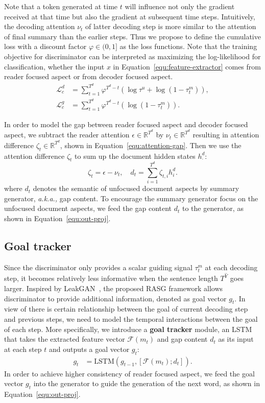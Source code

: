 \documentclass[letterpaper]{article}
\newcommand{\aka}{\emph{a.k.a.,}\xspace}
\begin{document}
Note that a token generated at time $t$ will influence not only the gradient received at that time but also the gradient at subsequent time steps.
Intuitively, the decoding attention $\nu_t$ of latter decoding step is more similar to the attention of final summary than the earlier steps.
Thus we propose to define the cumulative loss with a discount factor $\varphi \in (0,1]$ as the loss functions.
Note that the training objective for discriminator can be interpreted as maximizing the log-likelihood for classification, whether the input $x$ in Equation~\ref{equ:feature-extractor} comes from reader focused aspect or from decoder focused aspect.
\begin{align}
    \mathcal{L}^d_c &= \textstyle \sum^{T^d}_{t=1} \varphi^{T^d-t} (\log \tau^{u} + \log (1 - \tau^m_t)), \label{equ:dis-d}\\
    \mathcal{L}^g_c &= \textstyle \sum^{T^d}_{t=1} \varphi^{T^d-t} (\log (1 - \tau^m_t)). \label{equ:dis-c}
\end{align}

In order to model the gap between reader focused aspect and decoder focused aspect, we subtract the reader attention $\epsilon \in \mathbb{R}^{T^d}$ by $\nu_{t} \in \mathbb{R}^{T^d}$ resulting in attention difference $\zeta_t \in\mathbb{R}^{T^d}$, shown in Equation~\ref{equ:attention-gap}.
Then we use the attention difference $\zeta_t$ to sum up the document hidden states $h^d_{\cdot}$:
\begin{equation}
    \zeta_t = \epsilon - \nu_{t}, \label{equ:attention-gap} \quad
    d_t = \textstyle \sum^{T^d}_{i=1} \zeta_{t, i} h^d_i .
\end{equation}
where $d_t$ denotes the semantic of unfocused document aspects by summary generator, \aka gap content.
To encourage the summary generator focus on the unfocused document aspects, we feed the gap content $d_t$ to the generator, as shown in Equation~\ref{equ:out-proj}.

\subsection{Goal tracker} \label{sec:goal-tracker}

Since the discriminator only provides a scalar guiding signal $\tau^m_t$ at each decoding step, it becomes relatively less informative when the sentence length $T^{\hat{Y}}$ goes larger.
Inspired by LeakGAN~\cite{Guo2018LongTG}, the proposed RASG framework allows discriminator to provide additional information, denoted as goal vector $g_t$.
In view of there is certain relationship between the goal of current decoding step and previous steps, we need to model the temporal interactions between the goal of each step.
More specifically, we introduce a \textbf{goal tracker} module, an LSTM that takes the extracted feature vector $\mathcal{F}(m_t)$ and gap content $d_t$ as its input at each step $t$ and outputs a goal vector $g_t$:
\begin{align}
    g_t &= \text{LSTM} (g_{t-1}, [\mathcal{F}(m_t); d_t]) .
\end{align}
In order to achieve higher consistency of reader focused aspect, we feed the goal vector $g_t$ into the generator to guide the generation of the next word, as shown in Equation~\ref{equ:out-proj}.
\end{document}

